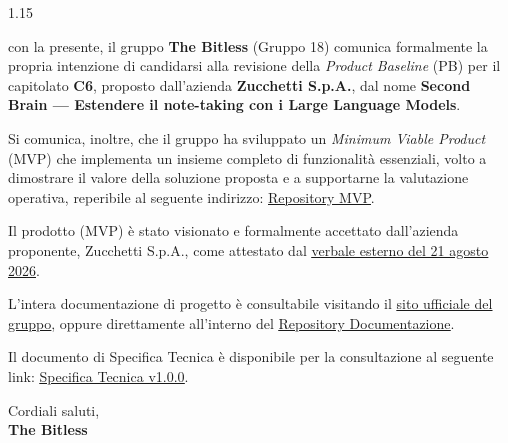 \documentclass[a4paper, 11pt]{article}
\let\orighref\href
\renewcommand{\href}[2]{\orighref{#1}{\uline{#2}}}
\newcommand{\versioneST}{1.0.0}
\begin{document}
\vspace{0.4cm}
\begin{spacing}{1.15}

\noindent con la presente, il gruppo \textbf{The Bitless} (Gruppo 18) comunica formalmente la propria intenzione di candidarsi alla revisione della \textit{Product Baseline} (PB) per il capitolato \textbf{C6}, proposto dall'azienda \textbf{Zucchetti S.p.A.}, dal nome \textbf{Second Brain --- Estendere il note-taking con i Large Language Models}.

\vspace{0.2cm}

\noindent Si comunica, inoltre, che il gruppo ha sviluppato un \textit{Minimum Viable Product} (MVP) che implementa un insieme completo di funzionalità essenziali, volto a dimostrare il valore della soluzione proposta e a supportarne la valutazione operativa, reperibile al seguente indirizzo: \href{https://github.com/thebitless-group-swe/MVP}{Repository MVP}.

\vspace{0.2cm}

\noindent Il prodotto (MVP) è stato visionato e formalmente accettato dall'azienda proponente, Zucchetti S.p.A., come attestato dal \href{https://thebitless.live/PB/doc_esterna/verbali/VE_2026-08-21_approvazione-mvp/VE_2026-08-21_approvazione-mvp.pdf}{verbale esterno del 21 agosto 2026}.

\vspace{0.2cm}

\noindent L'intera documentazione di progetto è consultabile visitando il \href{https://thebitless.live/}{sito ufficiale del gruppo}, oppure direttamente all'interno del \href{https://github.com/thebitless-group-swe/thebitless.github.io}{Repository Documentazione}.

\vspace{0.2cm}

\noindent Il documento di Specifica Tecnica è disponibile per la consultazione al seguente link: \href{https://thebitless.live/PB/doc_esterna/specifica_tecnica/specifica_tecnica.pdf}{Specifica Tecnica v\versioneST}.

\vspace{0.8cm}

\noindent Cordiali saluti, \\
\textbf{The Bitless}

\vspace{0.6cm}


\end{spacing}
\end{document}
